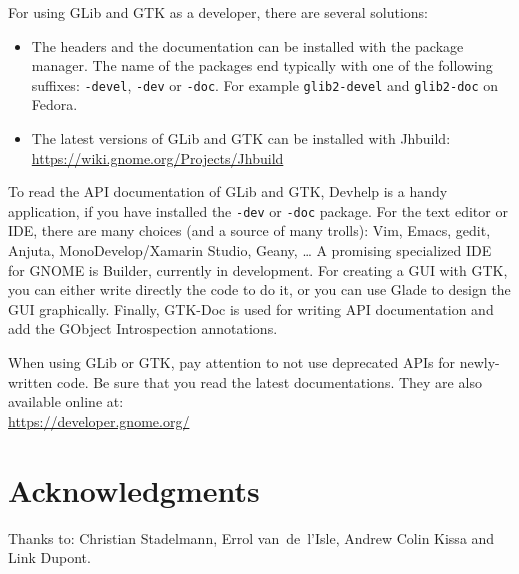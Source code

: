 For using GLib and GTK as a developer, there are several solutions:
\begin{itemize}
  \item The headers and the documentation can be installed with the package manager. The name of the packages end typically with one of the following suffixes: \texttt{-devel}, \texttt{-dev} or \texttt{-doc}. For example \texttt{glib2-devel} and \texttt{glib2-doc} on Fedora.
  \item The latest versions of GLib and GTK can be installed with Jhbuild:\\
  \url{https://wiki.gnome.org/Projects/Jhbuild}
\end{itemize}

To read the API documentation of GLib and GTK, Devhelp is a handy application, if you have installed the \texttt{-dev} or \texttt{-doc} package. For the text editor or IDE, there are many choices (and a source of many trolls): Vim, Emacs, gedit, Anjuta, MonoDevelop/Xamarin Studio, Geany, … A promising specialized IDE for GNOME is Builder, currently in development. For creating a GUI with GTK, you can either write directly the code to do it, or you can use Glade to design the GUI graphically. Finally, GTK-Doc is used for writing API documentation and add the GObject Introspection annotations.

When using GLib or GTK, pay attention to not use deprecated APIs for newly-written code. Be sure that you read the latest documentations. They are also available online at:\\
\url{https://developer.gnome.org/}

\section{Acknowledgments}

Thanks to: Christian Stadelmann, Errol van~de~l'Isle, Andrew Colin Kissa and Link Dupont.
